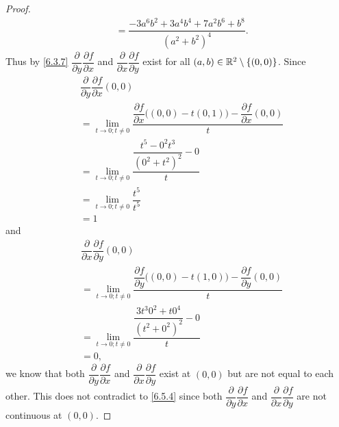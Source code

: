 \begin{proof}
\begin{align*}
     & = \dfrac{-3 a^6 b^2 + 3 a^4 b^4 + 7 a^2 b^6 + b^8}{(a^2 + b^2)^4}.
  \end{align*}
  Thus by \cref{6.3.7} \(\dfrac{\partial}{\partial y} \dfrac{\partial f}{\partial x}\) and \(\dfrac{\partial}{\partial x} \dfrac{\partial f}{\partial y}\) exist for all \((a, b) \in \mathbb{R}^2 \setminus \left\lbrace(0, 0)\right\rbrace\).
  Since
  \begin{align*}
     & \dfrac{\partial}{\partial y} \dfrac{\partial f}{\partial x}(0, 0)                                                                      \\
     & = \lim_{t \to 0 ; t \neq 0} \dfrac{\dfrac{\partial f}{\partial x}\big((0, 0) - t(0, 1)\big) - \dfrac{\partial f}{\partial x}(0, 0)}{t} \\
     & = \lim_{t \to 0 ; t \neq 0} \dfrac{\dfrac{t^5 - 0^2 t^3}{(0^2 + t^2)^2} - 0}{t}                                                        \\
     & = \lim_{t \to 0 ; t \neq 0} \dfrac{t^5}{t^5}                                                                                           \\
     & = 1
  \end{align*}
  and
  \begin{align*}
     & \dfrac{\partial}{\partial x} \dfrac{\partial f}{\partial y}(0, 0)                                                                      \\
     & = \lim_{t \to 0 ; t \neq 0} \dfrac{\dfrac{\partial f}{\partial y}\big((0, 0) - t(1, 0)\big) - \dfrac{\partial f}{\partial y}(0, 0)}{t} \\
     & = \lim_{t \to 0 ; t \neq 0} \dfrac{\dfrac{3 t^3 0^2 + t 0^4}{(t^2 + 0^2)^2} - 0}{t}                                                    \\
     & = 0,
  \end{align*}
  we know that both \(\dfrac{\partial}{\partial y} \dfrac{\partial f}{\partial x}\) and \(\dfrac{\partial}{\partial x} \dfrac{\partial f}{\partial y}\) exist at \((0, 0)\) but are not equal to each other.
  This does not contradict to \cref{6.5.4} since both \(\dfrac{\partial}{\partial y} \dfrac{\partial f}{\partial x}\) and \(\dfrac{\partial}{\partial x} \dfrac{\partial f}{\partial y}\) are not continuous at \((0, 0)\).
\end{proof}